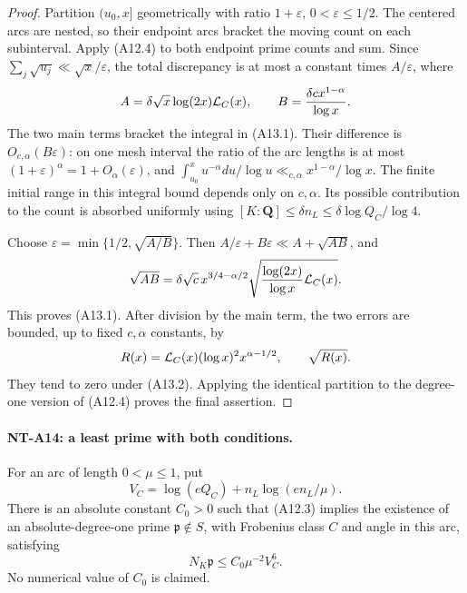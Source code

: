 \begin{proof}
Partition \((u_0,x]\) geometrically with ratio
\(1+\varepsilon\), \(0<\varepsilon\le1/2\).
The centered arcs are nested, so their endpoint arcs bracket
the moving count on each subinterval. Apply (A12.4) to both
endpoint prime counts and sum. Since
\(\sum_j\sqrt{u_j}\ll\sqrt x/\varepsilon\), the total
discrepancy is at most a constant times \(A/\varepsilon\),
where
\[
 A=\delta\sqrt x\log(2x){\cal L}_C(x),\qquad
 B=\frac{\delta c x^{1-\alpha}}{\log x}.
\]
The two main terms bracket the integral in (A13.1).
Their difference is \(O_{c,\alpha}(B\varepsilon)\):
on one mesh interval the ratio of the arc lengths is at most
\((1+\varepsilon)^\alpha=1+O_\alpha(\varepsilon)\), and
\(\int_{u_0}^x u^{-\alpha}du/\log u
 \ll_{c,\alpha}x^{1-\alpha}/\log x\).
The finite initial range in this integral bound depends only
on \(c,\alpha\). Its possible contribution to the count is
absorbed uniformly using
\([K:\mathbf Q]\le\delta n_L\le\delta\log Q_C/\log4\).

Choose \(\varepsilon=\min\{1/2,\sqrt{A/B}\}\).
Then \(A/\varepsilon+B\varepsilon\ll A+\sqrt{AB}\), and
\[
 \sqrt{AB}
  =\delta\sqrt c\,x^{3/4-\alpha/2}
       \sqrt{\frac{\log(2x)}{\log x}{\cal L}_C(x)}.
\]
This proves (A13.1). After division by the main term,
the two errors are bounded, up to fixed \(c,\alpha\)
constants, by
\[
 R(x)={\cal L}_C(x)(\log x)^2x^{\alpha-1/2},
 \qquad \sqrt{R(x)}.
\]
They tend to zero under (A13.2). Applying the identical
partition to the degree-one version of (A12.4) proves
the final assertion.
\end{proof}

\paragraph{NT-A14: a least prime with both conditions.}
For an arc of length \(0<\mu\le1\), put
\[
       V_C=\log(eQ_C)+n_L\log(e n_L/\mu).
\]
There is an absolute constant \(C_0>0\) such that (A12.3)
implies the existence of an absolute-degree-one prime
\(\mathfrak p\notin S\), with Frobenius class \(C\) and
angle in this arc, satisfying
\[
                  N_K\mathfrak p\le C_0\mu^{-2}V_C^6 .
                                                               \tag{A14.1}
\]
No numerical value of \(C_0\) is claimed.

